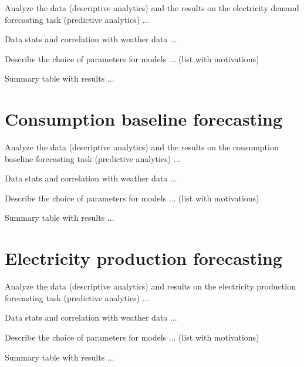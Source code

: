 Analyze the data (descriptive analytics) and the results on the electricity demand forecasting task (predictive analytics) ...

Data stats and correlation with weather data ...

Describe the choice of parameters for models ... (list with motivations)

Summary table with results ...


\section{Consumption baseline forecasting}
\label{sec:baselineval}
\vspace{0.2 cm}

Analyze the data (descriptive analytics) and the results on the consumption baseline forecasting task (predictive analytics) ...

Data stats and correlation with weather data ...

Describe the choice of parameters for models ... (list with motivations)

Summary table with results ...


\section{Electricity production forecasting}
\label{sec:productionval}
\vspace{0.2 cm}

Analyze the data (descriptive analytics) and results on the electricity production forecasting task (predictive analytics) ...

Data stats and correlation with weather data ...

Describe the choice of parameters for models ... (list with motivations)

Summary table with results ...
